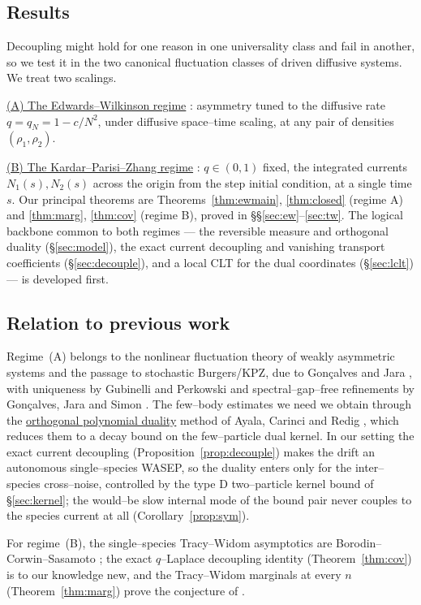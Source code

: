 \documentclass[11pt]{article}
\theoremstyle{plain}
\theoremstyle{definition}
\theoremstyle{remark}
\begin{document}
\subsection{Results}\label{sec:introresults}
Decoupling might hold for one reason in one universality class and fail in another, so
we test it in the two canonical fluctuation classes of driven diffusive systems. We
treat two scalings. 

\underline{(A) The Edwards--Wilkinson regime} \cite{EW}: asymmetry tuned to
the diffusive rate $q=q_N=1-c/N^2$, under diffusive space--time scaling, at any pair of
densities $(\rho_1,\rho_2)$. 

\underline{(B) The Kardar--Parisi--Zhang
regime} \cite{KPZ}: $q\in(0,1)$ fixed, the integrated currents $N_1(s),N_2(s)$ across the origin
from the step initial condition, at a single time $s$. Our principal theorems are
Theorems~\ref{thm:ewmain}, \ref{thm:closed} (regime A) and \ref{thm:marg},
\ref{thm:cov} (regime B), proved in \S\S\ref{sec:ew}--\ref{sec:tw}. The logical
backbone common to both regimes --- the reversible measure and orthogonal duality
(\S\ref{sec:model}), the exact current decoupling and vanishing transport
coefficients (\S\ref{sec:decouple}), and a local CLT for the dual coordinates
(\S\ref{sec:lclt}) --- is developed first.

\subsection{Relation to previous work}\label{sec:introlit}
Regime~(A) belongs to the nonlinear fluctuation theory of weakly asymmetric systems and
the passage to stochastic Burgers/KPZ, due to Gon\c{c}alves and Jara \cite{GJ}, with
uniqueness by Gubinelli and Perkowski \cite{GP} and spectral--gap--free refinements by
Gon\c{c}alves, Jara and Simon \cite{GJS}. The few--body estimates we need we obtain
through the \underline{orthogonal polynomial duality} method of Ayala, Carinci and Redig
\cite{ACR,ACR2}, which reduces them to a decay bound on the few--particle dual kernel. In
our setting the exact current decoupling (Proposition~\ref{prop:decouple}) makes the
drift an autonomous single--species WASEP, so the duality enters only for the
inter--species cross--noise, controlled by the type D two--particle kernel bound of
\S\ref{sec:kernel}; the would--be slow internal mode of the bound pair never couples to
the species current at all (Corollary~\ref{prop:sym}).

For regime~(B), the single--species Tracy--Widom asymptotics are
Borodin--Corwin--Sasamoto \cite{BCS}; the exact $q$--Laplace decoupling identity
(Theorem~\ref{thm:cov}) is to our knowledge new, and the Tracy--Widom marginals at
every $n$ (Theorem~\ref{thm:marg}) prove the conjecture of \cite[\S3.1.1]{REU}.
\end{document}

